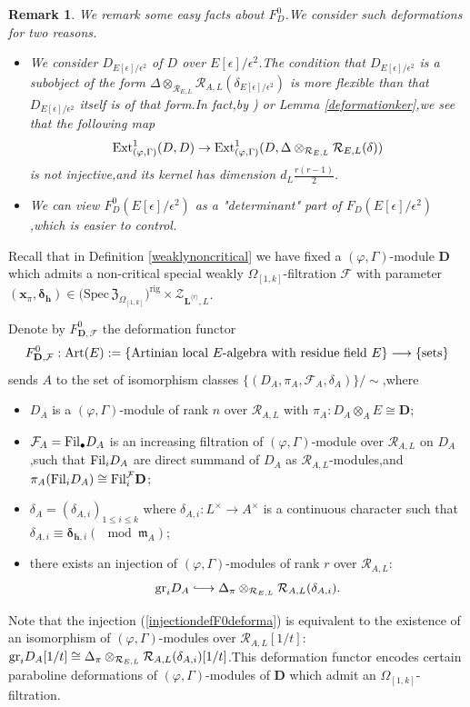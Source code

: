 \documentclass[SecEq,CM,GP]{degruyter-crelle} %
\theoremstyle{plain}
\newtheorem{rmk}[thm]{Remark}
\newcommand{\hooklongrightarrow}{\lhook\joinrel\longrightarrow}
\newcommand{\Art}{{\rm Art}}
\newcommand{\bmdel}{{ \bm{\delta}_\bh}}
\newcommand{\Dpik}{{\mathbf{D}}}
\newcommand{\ext}{{\rm Ext}}
\newcommand{\fil}{{\rm Fil}}
\newcommand{\gr}{{\rm gr}}
\newcommand{\lrr}{{\langle r\rangle}}
\newcommand{\omepik}{\Omega_{[1,k]}}
\newcommand{\rigchl}{{\mathcal{Z}_{\bL^{\lrr},L}}}
\newcommand{\sbanpik}{{\big(\mathrm{Spec}\hspace{2pt}\mathfrak{Z}_{\omepik}\big)^{\mathrm{rig}}}}
\newcommand{\bL}{{\mathbf{L}}}
\newcommand{\bx}{{\mathbf{x}}}
\newcommand{\bh}{{\mathbf{h}}}
\newcommand{\cR}{\mathcal R}
\newcommand{\cF}{\mathcal F}
\begin{document}
\begin{rmk}We remark some easy facts about $F_{D}^0$.\;We consider such deformations for 
two reasons.\;
\begin{itemize}
	\item We consider $D_{E[\epsilon]/\epsilon^2}$ of $D$ over $E[\epsilon]/\epsilon^2$.\;The condition that $D_{E[\epsilon]/\epsilon^2}$ is a subobject of the form ${\Delta}\otimes_{\cR_{E,L}}\cR_{A,L}({\delta}_{E[\epsilon]/\epsilon^2})$ is more flexible than that $D_{E[\epsilon]/\epsilon^2}$ itself is of that form.\;In fact,\;by 
	\cite[Proposition 4.1.4]{Ding2021}) or Lemma \ref{deformationker},\;we see that the following map \[\ext^1_{(\varphi,\Gamma)}(D,D)\rightarrow\ext^1_{(\varphi,\Gamma)}(D,{\Delta}\otimes_{\cR_{E,L}}\cR_{E,L}({\delta}))\] is not injective,\;and its kernel has dimension $d_L\frac{r(r-1)}{2}$.\;
	\item We can view $F_{D}^0(E[\epsilon]/\epsilon^2)$ as a "determinant" part of $F_{D}(E[\epsilon]/\epsilon^2)$,\;which is easier to control.\;
\end{itemize}
\end{rmk}


Recall that in Definition  \ref{weaklynoncritical} we have fixed a $(\varphi,\Gamma)$-module $\Dpik$ which admits a non-critical special weakly  $\omepik$-filtration $\cF$ with parameter $(\bx_{\pi},\bmdel)\in \sbanpik\times\rigchl $.\;

Denote by $F_{\Dpik,\cF}^0$ the deformation functor
\[F_{\Dpik,\cF}^0:\Art(E):=\{\text{Artinian local $E$-algebra with residue field $E$}\}\longrightarrow \{\text{sets}\}\]
sends $A$ to the set of isomorphism classes $\{(D_A,\pi_A,\cF_A,\delta_A)\}/\sim$,\;where
\begin{itemize}
\item[(1)] $D_A$ is a $(\varphi,\Gamma)$-module of rank $n$ over $\cR_{A,L}$ with $\pi_A:D_A\otimes_AE\cong \Dpik$;
\item[(2)] $\cF_A=\fil_{\bullet}D_A$ is an increasing filtration of $(\varphi,\Gamma)$-module over $\cR_{A,L}$ on $D_A$,\;such that $\fil_{i}D_A$ are direct summand of $D_A$ as $\cR_{A,L}$-modules,\;and $\pi_A(\fil_{i}D_A)\cong \fil_{i}^\cF \Dpik$;
\item[(3)] ${\delta}_A=({\delta}_{A,i})_{1\leq i\leq k}$ where ${\delta}_{A,i}:L^\times\rightarrow A^\times$ is a continuous character such that ${\delta}_{A,i}\equiv \bm{\delta}_{\bh,i}(\mod \mathfrak{m}_A)$;
\item[(4)] there exists an injection of $(\varphi,\Gamma)$-modules of rank $r$ over $\cR_{A,L}$:
\begin{equation}\label{injectiondefF0deforma}
	\gr_iD_A\hooklongrightarrow {\Delta_\pi}\otimes_{\cR_{E,L}}\cR_{A,L}({\delta}_{A,i}).
\end{equation}
\end{itemize}
Note that the injection (\ref{injectiondefF0deforma}) is equivalent to the existence of an isomorphism of $(\varphi,\Gamma)$-modules over $\cR_{A,L}[1/t]$:
$\gr_iD_A[1/t]\cong{\Delta_\pi}\otimes_{\cR_{E,L}}\cR_{A,L}({\delta}_{A,i})[1/t]$.\;This deformation functor encodes certain paraboline deformations of $(\varphi,\Gamma)$-modules of $\Dpik$ which admit an $\omepik$-filtration.\;
\end{document}

